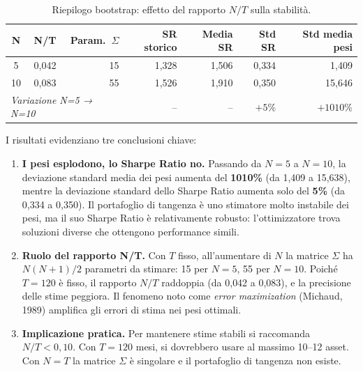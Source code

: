 \documentclass[11pt]{article}
\begin{document}
\begin{table}[h!]
\centering
\caption{Riepilogo bootstrap: effetto del rapporto $N/T$ sulla stabilità.}
\label{tab:riepilogo}
\begin{tabular}{crrrrrr}
\toprule
\textbf{N} & \textbf{N/T} & \textbf{Param.\ $\Sigma$} &
\textbf{SR storico} & \textbf{Media SR} & \textbf{Std SR} &
\textbf{Std media pesi} \\
\midrule
 5 & 0{,}042 & 15  & 1{,}328 & 1{,}506 & 0{,}334 &  1{,}409 \\
10 & 0{,}083 & 55  & 1{,}526 & 1{,}910 & 0{,}350 & 15{,}646 \\
\midrule
\multicolumn{3}{l}{\textit{Variazione N=5 → N=10}} & -- & -- & $+5\%$ & $+1010\%$ \\
\bottomrule
\end{tabular}
\end{table}

I risultati evidenziano tre conclusioni chiave:

\begin{enumerate}
  \item \textbf{I pesi esplodono, lo Sharpe Ratio no.}
        Passando da $N{=}5$ a $N{=}10$, la deviazione standard media
        dei pesi aumenta del \textbf{1010\%} (da 1{,}409 a 15{,}638),
        mentre la deviazione standard dello Sharpe Ratio aumenta
        solo del \textbf{5\%} (da 0{,}334 a 0{,}350).
        Il portafoglio di tangenza è uno stimatore molto instabile
        dei pesi, ma il suo Sharpe Ratio è relativamente robusto:
        l'ottimizzatore trova soluzioni diverse che ottengono
        performance simili.

  \item \textbf{Ruolo del rapporto N/T.}
        Con $T$ fisso, all'aumentare di $N$ la matrice $\Sigma$
        ha $N(N{+}1)/2$ parametri da stimare: 15 per $N{=}5$,
        55 per $N{=}10$. Poiché $T{=}120$ è fisso, il rapporto
        $N/T$ raddoppia (da 0{,}042 a 0{,}083), e la precisione
        delle stime peggiora. Il fenomeno noto come
        \emph{error maximization} (Michaud, 1989) amplifica
        gli errori di stima nei pesi ottimali.

  \item \textbf{Implicazione pratica.}
        Per mantenere stime stabili si raccomanda $N/T < 0{,}10$.
        Con $T{=}120$ mesi, si dovrebbero usare al massimo
        10--12 asset. Con $N = T$ la matrice $\Sigma$ è
        singolare e il portafoglio di tangenza non esiste.
\end{enumerate}
\end{document}
